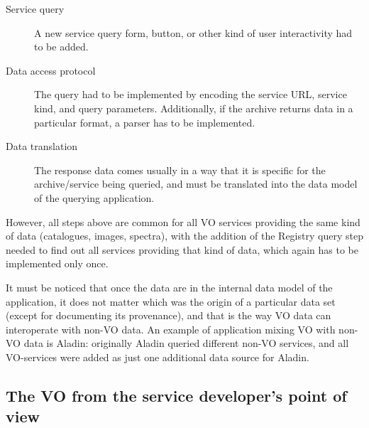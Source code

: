 		\begin{description}
			\item[Service query] A new service query form, button,
			or other kind of user interactivity had to be added.
			
			 \item[Data access protocol] The query had to be
			implemented by encoding the service URL, service kind,
			and query parameters. Additionally, if the archive
			returns data in a particular format, a parser has to be
			implemented. %
			
			 \item[Data translation] The response data comes
			usually in a way that it is specific for the
			archive/service being queried, and must be translated
			into the data model of the querying application.
		\end{description}

		However, all steps above are common for all VO services
		providing the same kind of data (catalogues, images,
		spectra), with the addition of the Registry query step
		needed to find out all services providing that kind of
		data, which again has to be implemented only once.
		
		 It must be noticed that once the data are in the internal
		data model of the application, it does not matter which was
		the origin of a particular data set (except for documenting
		its provenance), and that is the way VO data can
		interoperate with non-VO data. An example of application
		mixing VO with non-VO data is Aladin: originally Aladin
		queried different non-VO services, and all VO-services were
		added as just one additional data source for Aladin.





	\subsection{The VO from the service developer's point of view}
	\label{ssub:the_vo_from_the_point_of_view_of_the_service_developer}

